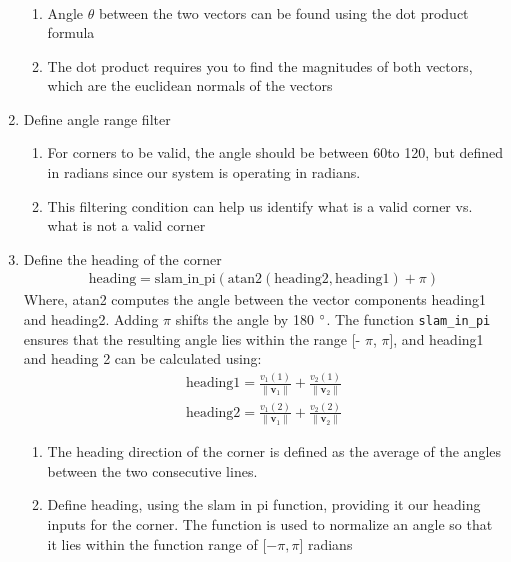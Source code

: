 \begin{enumerate}
\begin{align*}
    \end{align*}
    \begin{enumerate}
        \item Angle $\theta$ between the two vectors can be found using the dot product formula
        \item The dot product requires you to find the magnitudes of both vectors, which are the euclidean normals of the vectors 
    \end{enumerate}
    \item Define angle range filter
    \begin{enumerate}
        \item For corners to be valid, the angle should be between 60\degree to 120\degree, but defined in radians since our system is operating in radians.
        \item This filtering condition can help us identify what is a valid corner vs. what is not a valid corner
    \end{enumerate}
    \item Define the heading of the corner
    \begin{align}
    \text{heading} = \text{slam\_in\_pi}\left( \text{atan2}(\text{heading2}, \text{heading1}) + \pi \right)
    \end{align}
    Where, atan2 computes the angle between the vector components heading1 and heading2. Adding $\pi$ shifts the angle by 180 $\degree$. The function \texttt{slam\_in\_pi} ensures that the resulting angle lies within the range [- $\pi$, $\pi$], and heading1 and heading 2 can be calculated using:
    \begin{align*}
    \text{heading1} = \frac{v_1(1)}{\|\mathbf{v}_1\|} + \frac{v_2(1)}{\|\mathbf{v}_2\|}\\
    \text{heading2} = \frac{v_1(2)}{\|\mathbf{v}_1\|} + \frac{v_2(2)}{\|\mathbf{v}_2\|}
    \end{align*}
    \begin{enumerate}
        \item The heading direction of the corner is defined as the average of the angles between the two consecutive lines.
        \item Define heading, using the slam in pi function, providing it our heading inputs for the corner. The function is used to normalize an angle so that it lies within the function range of [$-\pi,\pi$] radians
    \end{enumerate}
\end{enumerate}

